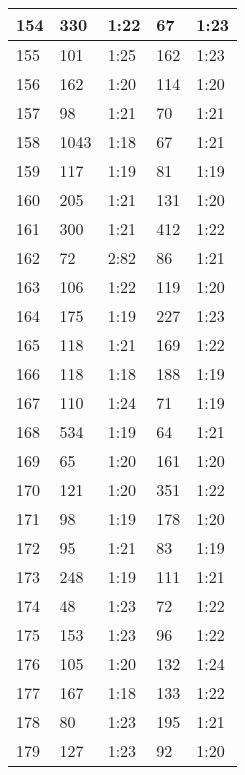 \begin{center}
\begin{longtable}{|p{2cm}|l|l|l|l|}
154	&   330           &  1:22  &		67      	& 1:23 \\ \hline
155	&   101           &  1:25  &		162     	& 1:23 \\ \hline
156	&   162           &  1:20  &		114     	& 1:20 \\ \hline
157	&   98            &  1:21  &		70      	& 1:21 \\ \hline
158	&   1043          &  1:18  &		67      	& 1:21 \\ \hline
159	&   117           &  1:19  &		81      	& 1:19 \\ \hline
160	&   205           &  1:21  &		131     	& 1:20 \\ \hline
161	&   300           &  1:21  &		412     	& 1:22 \\ \hline
162	&   72            &  2:82  &        86          & 1:21 \\ \hline
163	&   106           &  1:22  &		119     	& 1:20 \\ \hline
164	&   175           &  1:19  &		227     	& 1:23 \\ \hline
165	&   118           &  1:21  &		169     	& 1:22 \\ \hline
166	&   118           &  1:18  &		188     	& 1:19 \\ \hline
167	&   110           &  1:24  &		71      	& 1:19 \\ \hline
168	&   534           &  1:19  &		64      	& 1:21 \\ \hline
169	&   65            &  1:20  &		161     	& 1:20 \\ \hline
170	&   121           &  1:20  &		351     	& 1:22 \\ \hline
171	&   98            &  1:19  &		178     	& 1:20 \\ \hline
172	&   95            &  1:21  &		83      	& 1:19 \\ \hline
173	&   248           &  1:19  &		111     	& 1:21 \\ \hline
174	&   48            &  1:23  &		72      	& 1:22 \\ \hline
175	&   153           &  1:23  &		96      	& 1:22 \\ \hline
176	&   105           &  1:20  &		132     	& 1:24 \\ \hline
177	&   167           &  1:18  &		133     	& 1:22 \\ \hline
178	&   80            &  1:23  &		195     	& 1:21 \\ \hline
179	&   127           &  1:23  &		92      	& 1:20 \\ \hline

\end{longtable}
\end{center}

